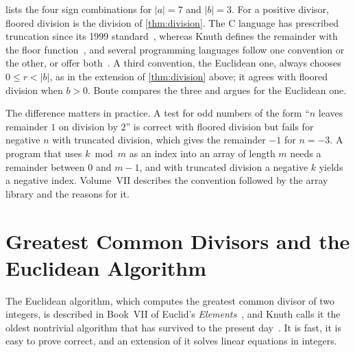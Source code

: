  lists the four sign combinations for $|a|=7$ and $|b|=3$. For a positive divisor, floored division is the division of \cref{thm:division}. The C language has prescribed truncation since its 1999 standard~\cite{iso9899-1999}, whereas Knuth defines the remainder with the floor function~\cite{graham1994concrete}, and several programming languages follow one convention or the other, or offer both~\cite{boute1992}. A third convention, the Euclidean one, always chooses $0\le r<|b|$, as in the extension of \cref{thm:division} above; it agrees with floored division when $b>0$. Boute compares the three and argues for the Euclidean one.

\begin{table}
\end{table}

The difference matters in practice. A test for odd numbers of the form ``$n$ leaves remainder $1$ on division by $2$'' is correct with floored division but fails for negative $n$ with truncated division, which gives the remainder $-1$ for $n=-3$. A program that uses $k\bmod m$ as an index into an array of length $m$ needs a remainder between $0$ and $m-1$, and with truncated division a negative $k$ yields a negative index. Volume~VII describes the convention followed by the array library and the reasons for it.

\section{Greatest Common Divisors and the Euclidean Algorithm}
\label{sec:gcd}

The Euclidean algorithm, which computes the greatest common divisor of two integers, is described in Book~VII of Euclid's \emph{Elements}~\cite{heath1956euclid}, and Knuth calls it the oldest nontrivial algorithm that has survived to the present day~\cite[Sect.~4.5.2]{knuth1997taocp2}. It is fast, it is easy to prove correct, and an extension of it solves linear equations in integers.

